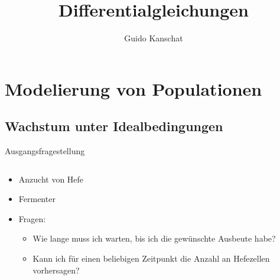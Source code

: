 \documentclass[notheorems,hidelinks,aspectratio=1610]{beamer}
\title{Differentialgleichungen}
\author{Guido Kanschat}
\date{}
\begin{document}
\frame{\maketitle}

\section{Modelierung von Populationen}
\frame{\sectoc}
\subsection{Wachstum unter Idealbedingungen}
\frame{\subtoc}
\begin{frame}{Ausgangsfragestellung}
  \begin{columns}
    \begin{column}{.6\textwidth}
      \begin{itemize}
      \item<+-> Anzucht von Hefe
      \item<+-> Fermenter
      \item<+-> Fragen:
        \begin{itemize}
        \item<+-> Wie lange muss ich warten, bis ich die gewünschte Ausbeute habe?
        \item<+-> Kann ich für einen beliebigen Zeitpunkt die Anzahl
          an Hefezellen vorhersagen?
        \end{itemize}
      \end{itemize}
    \end{column}
    \begin{column}{.39\textwidth}
      \begin{center}
\end{center}
\end{column}
\end{columns}
\end{frame}
\end{document}
